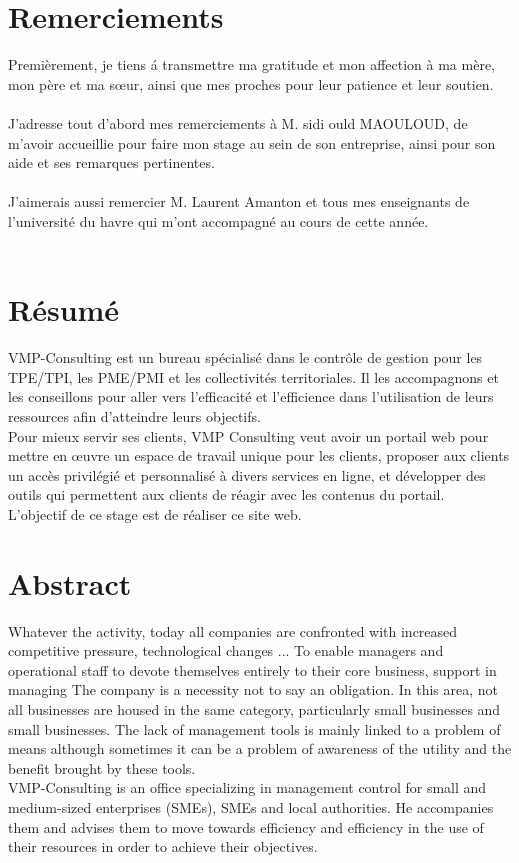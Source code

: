 \documentclass[12pt]{article}
\begin{document}
\section*{Remerciements}
Premièrement, je tiens á transmettre ma gratitude et mon affection à ma mère, mon père  et ma
sœur, ainsi que mes proches pour leur patience et leur soutien.\\ \\

J’adresse tout d’abord mes remerciements à  M. sidi ould MAOULOUD, de m’avoir accueillie pour faire mon
stage au sein de son entreprise, ainsi pour son aide et  ses  remarques pertinentes.  \\ \\
J’aimerais aussi remercier M. Laurent Amanton  et tous mes enseignants de l’université du havre
qui m’ont accompagné 
au cours de cette année.\\ \\


\newpage

\section*{Résumé}
VMP-Consulting est un bureau spécialisé dans le contrôle de gestion pour les TPE/TPI, les PME/PMI et les collectivités territoriales. Il les accompagnons et les conseillons pour aller vers l'efficacité et l'efficience dans l'utilisation de leurs ressources afin d'atteindre leurs objectifs.\\
Pour mieux servir ses clients, VMP Consulting veut avoir un portail web pour 
mettre en œuvre un espace de travail unique pour les clients, 
 proposer aux clients un accès privilégié et personnalisé à divers services en
ligne, et 
développer des outils qui permettent aux clients de réagir avec les contenus du
portail.\\
L'objectif de ce stage est de réaliser ce site web.


\section*{Abstract}
Whatever the activity, today all companies are confronted with increased competitive pressure, technological changes ... To enable managers and operational staff to devote themselves entirely to their core business, support in managing The company is a necessity not to say an obligation. In this area, not all businesses are housed in the same category, particularly small businesses and small businesses. The lack of management tools is mainly linked to a problem of means although sometimes it can be a problem of awareness of the utility and the benefit brought by these tools.\\
VMP-Consulting is an office specializing in management control for small and medium-sized enterprises (SMEs), SMEs and local authorities. He accompanies them and advises them to move towards efficiency and efficiency in the use of their resources in order to achieve their objectives.
\end{document}
